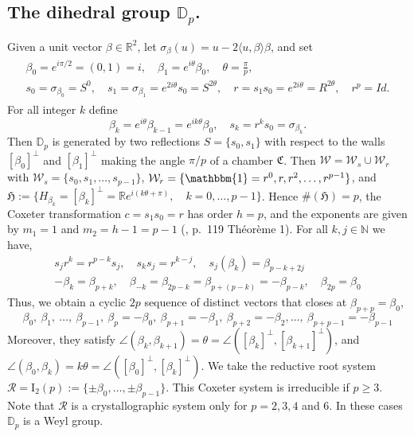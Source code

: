 \documentclass[11pt,a4paper,times]{amsart}
\theoremstyle{plain}
\theoremstyle{definition}
\numberwithin{equation}{section}
\newcommand{\R}{\mathbb{R}}
\newcommand{\D}{\mathbb{D}}
\begin{document}
{ \subsection{The dihedral group $\D_p$.}\label{Dp} Given a unit vector $\beta\in \R^2$, let
$\sigma_{\beta}(u)=u-2\langle u,\beta\rangle \beta$, and set 
\begin{gather*}
\begin{array}{l}
\beta_0=e^{i\pi/2}=(0,1)=i,\quad \beta_1=e^{i\theta}\beta_0, \quad \theta=\frac{\pi}{p},\\
s_0=\sigma_{\beta_0}=S^0, \quad s_1=\sigma_{\beta_1}=e^{2i\theta}s_0=S^{2\theta},
\quad
r=s_1s_0=e^{2i\theta}=R^{2\theta}, \quad r^p=Id.
\end{array}
\end{gather*}
For all integer $k$ define
\[\beta_{k}=e^{i\theta}\beta_{k-1}= e^{ik\theta}\beta_0, \quad s_k=r^ks_0=\sigma_{\beta_k}.\]
Then $\D_p$ is generated by two reflections 
$S=\{s_0,s_1\}$ with respect to  the walls $[\beta_0]^{\bot}$ and $[\beta_1]^{\bot}$
making the angle $\pi/p$  of a chamber $\mathfrak{C}$. Then 
$\mathcal{W}=\mathcal{W}_s\cup \mathcal{W}_r$
with  
$\mathcal{W}_s=\{s_0,s_1, \ldots, s_{p-1}\}$,  $\mathcal{W}_r= 
\{\mathbbm{1}=r^0, r,r^2,\ldots, r^{p-1}\}$,
and 
$\mathfrak{H}:= \{H_{\beta_k}=[\beta_k]^{\bot}=\mathbb{R}e^{i(k\theta+\pi)}, \quad k=0,\ldots, p-1\}$.
 Hence 
$\#(\mathfrak{H})=p$,  
the Coxeter transformation 
$c=s_1s_0=r$ has order $h=p$, and the  exponents are given by $m_1=1$ and $m_2=h-1=p-1$ (\cite{BOU}, p.\ 119
Th\'{e}or\`{e}me 1).
For all $k,j\in \mathbb{N}$ we have,
{ \begin{equation}\label{relations}
 \begin{array}{l}
  s_jr^k=r^{p-k}s_j, \quad
  s_ks_j=r^{k-j}, \quad 
s_j(\beta_k)=\beta_{p-k+2j}\\
-\beta_k=\beta_{p+k}, \quad \beta_{-k}=\beta_{2p-k}=
\beta_{p+(p-k)}=-\beta_{p-k}, \quad \beta_{2p}=\beta_0
\end{array}
\end{equation}
}
Thus, we obtain a cyclic $2p$ sequence of distinct vectors that closes at $\beta_{p+p}=\beta_0$, 
\begin{equation}\label{anticlockwiseorder} 
\beta_0, ~\beta_1, ~\ldots, ~\beta_{p-1}, ~\beta_p=-\beta_0, ~\beta_{p+1}=-\beta_1,~\beta_{p+2}= -\beta_2, \ldots, ~\beta_{p+p-1}=-\beta_{p-1}
\end{equation}
 Moreover, they satisfy 
 $\angle(\beta_k,\beta_{k+1})=\theta = \angle([\beta_k]^{\bot},[\beta_{k+1}]^{\bot})$, and $\angle(\beta_0,\beta_{k})=k\theta = \angle([\beta_0]^{\bot},[\beta_{k}]^{\bot})$.
We take the reductive root system
$\mathcal{R}=\mathrm{I}_2(p):=\{\pm\beta_0, \dots, \pm\beta_{p-1}\}$.
This Coxeter system is irreducible if $p\geq 3$.
Note that $\mathcal{R}$ is a crystallographic system only for $p=2,3,4$ and $6$. In these cases $\mathbb{D}_p$ is a Weyl group.  

}
\end{document}
